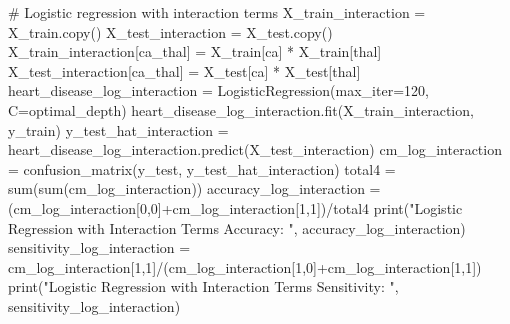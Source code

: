 \documentclass[
  11pt,
  letterpaper,
  DIV=11,
  numbers=noendperiod]{scrartcl}
\newenvironment{Shaded}{\begin{snugshade}}{\end{snugshade}}
\newcommand{\BuiltInTok}[1]{\textcolor[rgb]{0.00,0.23,0.31}{#1}}
\newcommand{\CommentTok}[1]{\textcolor[rgb]{0.37,0.37,0.37}{#1}}
\newcommand{\DecValTok}[1]{\textcolor[rgb]{0.68,0.00,0.00}{#1}}
\newcommand{\NormalTok}[1]{\textcolor[rgb]{0.00,0.23,0.31}{#1}}
\newcommand{\OperatorTok}[1]{\textcolor[rgb]{0.37,0.37,0.37}{#1}}
\newcommand{\StringTok}[1]{\textcolor[rgb]{0.13,0.47,0.30}{#1}}
\begin{document}
\begin{Shaded}
\begin{Highlighting}[]
\CommentTok{\# Logistic regression with interaction terms}
\NormalTok{X\_train\_interaction }\OperatorTok{=}\NormalTok{ X\_train.copy()}
\NormalTok{X\_test\_interaction }\OperatorTok{=}\NormalTok{ X\_test.copy()}
\NormalTok{X\_train\_interaction[}\StringTok{\textquotesingle{}ca\_thal\textquotesingle{}}\NormalTok{] }\OperatorTok{=}\NormalTok{ X\_train[}\StringTok{\textquotesingle{}ca\textquotesingle{}}\NormalTok{] }\OperatorTok{*}\NormalTok{ X\_train[}\StringTok{\textquotesingle{}thal\textquotesingle{}}\NormalTok{]}
\NormalTok{X\_test\_interaction[}\StringTok{\textquotesingle{}ca\_thal\textquotesingle{}}\NormalTok{] }\OperatorTok{=}\NormalTok{ X\_test[}\StringTok{\textquotesingle{}ca\textquotesingle{}}\NormalTok{] }\OperatorTok{*}\NormalTok{ X\_test[}\StringTok{\textquotesingle{}thal\textquotesingle{}}\NormalTok{]}
\NormalTok{heart\_disease\_log\_interaction }\OperatorTok{=}\NormalTok{ LogisticRegression(max\_iter}\OperatorTok{=}\DecValTok{120}\NormalTok{, C}\OperatorTok{=}\NormalTok{optimal\_depth)}
\NormalTok{heart\_disease\_log\_interaction.fit(X\_train\_interaction, y\_train)}
\NormalTok{y\_test\_hat\_interaction }\OperatorTok{=}\NormalTok{ heart\_disease\_log\_interaction.predict(X\_test\_interaction)}
\NormalTok{cm\_log\_interaction }\OperatorTok{=}\NormalTok{ confusion\_matrix(y\_test, y\_test\_hat\_interaction)}
\NormalTok{total4 }\OperatorTok{=} \BuiltInTok{sum}\NormalTok{(}\BuiltInTok{sum}\NormalTok{(cm\_log\_interaction))}
\NormalTok{accuracy\_log\_interaction }\OperatorTok{=}\NormalTok{ (cm\_log\_interaction[}\DecValTok{0}\NormalTok{,}\DecValTok{0}\NormalTok{]}\OperatorTok{+}\NormalTok{cm\_log\_interaction[}\DecValTok{1}\NormalTok{,}\DecValTok{1}\NormalTok{])}\OperatorTok{/}\NormalTok{total4}
\BuiltInTok{print}\NormalTok{(}\StringTok{"Logistic Regression with Interaction Terms Accuracy: "}\NormalTok{, accuracy\_log\_interaction)}
\NormalTok{sensitivity\_log\_interaction }\OperatorTok{=}\NormalTok{ cm\_log\_interaction[}\DecValTok{1}\NormalTok{,}\DecValTok{1}\NormalTok{]}\OperatorTok{/}\NormalTok{(cm\_log\_interaction[}\DecValTok{1}\NormalTok{,}\DecValTok{0}\NormalTok{]}\OperatorTok{+}\NormalTok{cm\_log\_interaction[}\DecValTok{1}\NormalTok{,}\DecValTok{1}\NormalTok{])}
\BuiltInTok{print}\NormalTok{(}\StringTok{"Logistic Regression with Interaction Terms Sensitivity: "}\NormalTok{, sensitivity\_log\_interaction)}
\end{Highlighting}
\end{Shaded}
\end{document}

